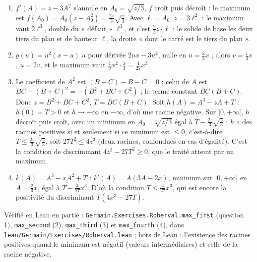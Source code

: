 \documentclass[11pt,a4paper]{article}
\begin{document}
\begin{solution}
\begin{enumerate}
\item $f'(A) = z - 3A^2$ s'annule en $A_0 = \sqrt{z/3}$, $f$ croît puis décroît :
  le maximum est $f(A_0) = A_0(z - A_0^2) = \frac{2z}{3}\sqrt{\frac z3}$. Avec
  $\ell = A_0$, $z = 3\ell^2$ : le maximum vaut $2\ell^3$, double du « défaut »
  $\ell^3$, et c'est $\frac23 z\cdot\ell$ : le solide de base les deux tiers du plan
  et de hauteur $\ell$, la droite « dont le carré est le tiers du plan ».
\item $g(u) = u^2(x - u)$ a pour dérivée $2ux - 3u^2$, nulle en $u = \frac23x$ ;
  alors $v = \frac13 x$, $u = 2v$, et le maximum vaut $\frac49x^2\cdot\frac{x}{3} =
  \frac{4}{27}x^3$.
\item Le coefficient de $A^2$ est $(B + C) - B - C = 0$ ; celui de $A$ est
  $BC - (B+C)^2 = -(B^2 + BC + C^2)$ ; le terme constant $BC(B+C)$. Donc
  $z = B^2 + BC + C^2$, $T = BC(B+C)$. Soit $h(A) = A^3 - zA + T$ : $h(0) = T > 0$
  et $h \to -\infty$ en $-\infty$, d'où une racine négative. Sur $]0, +\infty[$,
  $h$ décroît puis croît, avec un minimum en $A_0 = \sqrt{z/3}$ égal à
  $T - \frac{2z}{3}\sqrt{\frac z3}$ ; $h$ a des racines positives si et seulement
  si ce minimum est $\le 0$, c'est-à-dire $T \le \frac{2z}{3}\sqrt{\frac{z}{3}}$,
  soit $27T^2 \le 4z^3$ (deux racines, confondues en cas d'égalité). C'est la
  condition de discriminant $4z^3 - 27T^2 \ge 0$, que le traité atteint par un
  maximum.
\item $k(A) = A^3 - xA^2 + T$ : $k'(A) = A(3A - 2x)$, minimum sur $]0, +\infty[$ en
  $A = \frac23x$, égal à $T - \frac{4}{27}x^3$. D'où la condition
  $T \le \frac{4}{27}x^3$, qui est encore la positivité du discriminant
  $T(4x^3 - 27T)$.
\end{enumerate}

Vérifié en Lean en partie : \texttt{Germain.Exercises.Roberval.max\_first} (question 1),
\texttt{max\_second} (2), \texttt{max\_third} (3) et \texttt{max\_fourth} (4), dans
\texttt{lean/Germain/Exercises/Roberval.lean} ; hors de Lean : l'existence des racines positives quand le minimum est
négatif (valeurs intermédiaires) et celle de la racine négative.
\end{solution}
\end{document}
